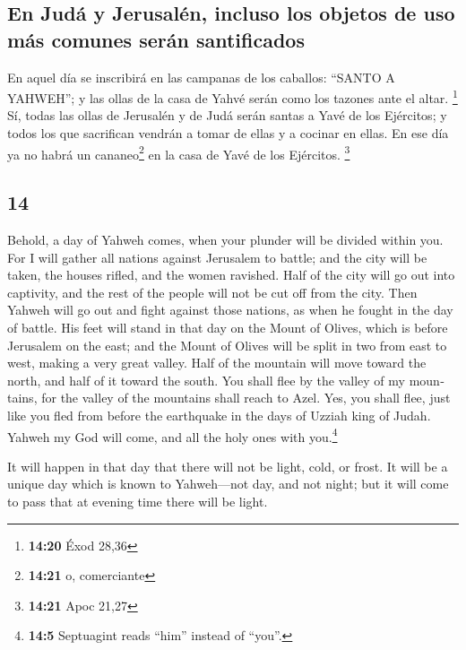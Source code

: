 \begin{paracol}{2}
\hypertarget{en-juduxe1-y-jerusaluxe9n-incluso-los-objetos-de-uso-muxe1s-comunes-seruxe1n-santificados}{%
\subsection{En Judá y Jerusalén, incluso los objetos de uso más comunes
serán
santificados}\label{en-juduxe1-y-jerusaluxe9n-incluso-los-objetos-de-uso-muxe1s-comunes-seruxe1n-santificados}}

 En aquel día se inscribirá en las campanas de los
caballos: ``SANTO A YAHWEH''; y las ollas de la casa de Yahvé serán como
los tazones ante el altar. \footnote{\textbf{14:20} Éxod 28,36}
 Sí, todas las ollas de Jerusalén y de Judá serán santas
a Yavé de los Ejércitos; y todos los que sacrifican vendrán a tomar de
ellas y a cocinar en ellas. En ese día ya no habrá un cananeo\footnote{\textbf{14:21}
  o, comerciante} en la casa de Yavé de los Ejércitos. \footnote{\textbf{14:21}
  Apoc 21,27} \switchcolumn \begin{otherlanguage}{english}

\hypertarget{section-27}{%
\section{14}\label{section-27}}

 Behold, a day of Yahweh comes, when your plunder will be
divided within you.  For I will gather all nations against
Jerusalem to battle; and the city will be taken, the houses rifled, and
the women ravished. Half of the city will go out into captivity, and the
rest of the people will not be cut off from the city. 
Then Yahweh will go out and fight against those nations, as when he
fought in the day of battle.  His feet will stand in that
day on the Mount of Olives, which is before Jerusalem on the east; and
the Mount of Olives will be split in two from east to west, making a
very great valley. Half of the mountain will move toward the north, and
half of it toward the south.  You shall flee by the valley
of my mountains, for the valley of the mountains shall reach to Azel.
Yes, you shall flee, just like you fled from before the earthquake in
the days of Uzziah king of Judah. Yahweh my God will come, and all the
holy ones with you.\footnote{\textbf{14:5} Septuagint reads ``him''
  instead of ``you''.}

 It will happen in that day that there will not be light,
cold, or frost.  It will be a unique day which is known to
Yahweh---not day, and not night; but it will come to pass that at
evening time there will be light.


\end{otherlanguage}
\end{paracol}
